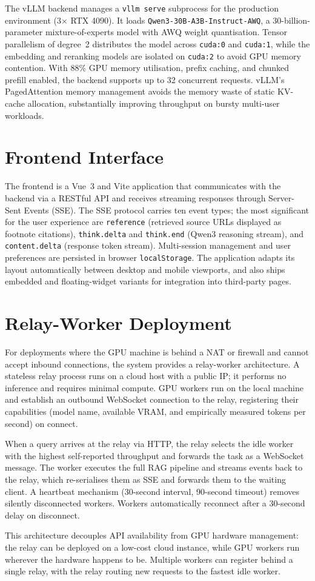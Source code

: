 The vLLM backend \parencite{vllm2023} manages a \texttt{vllm serve} subprocess for the production environment (3$\times$ RTX 4090). It loads \texttt{Qwen3-30B-A3B-Instruct-AWQ}, a 30-billion-parameter mixture-of-experts model with AWQ weight quantisation. Tensor parallelism of degree~2 distributes the model across \texttt{cuda:0} and \texttt{cuda:1}, while the embedding and reranking models are isolated on \texttt{cuda:2} to avoid GPU memory contention. With 88\% GPU memory utilisation, prefix caching, and chunked prefill enabled, the backend supports up to 32 concurrent requests. vLLM's PagedAttention memory management avoids the memory waste of static KV-cache allocation, substantially improving throughput on bursty multi-user workloads.

\section{Frontend Interface}

The frontend is a Vue~3 and Vite application that communicates with the backend via a RESTful API and receives streaming responses through Server-Sent Events (SSE). The SSE protocol carries ten event types; the most significant for the user experience are \texttt{reference} (retrieved source URLs displayed as footnote citations), \texttt{think.delta} and \texttt{think.end} (Qwen3 reasoning stream), and \texttt{content.delta} (response token stream). Multi-session management and user preferences are persisted in browser \texttt{localStorage}. The application adapts its layout automatically between desktop and mobile viewports, and also ships embedded and floating-widget variants for integration into third-party pages.

\section{Relay-Worker Deployment}

For deployments where the GPU machine is behind a NAT or firewall and cannot accept inbound connections, the system provides a relay-worker architecture. A stateless relay process runs on a cloud host with a public IP; it performs no inference and requires minimal compute. GPU workers run on the local machine and establish an outbound WebSocket connection to the relay, registering their capabilities (model name, available VRAM, and empirically measured tokens per second) on connect.

When a query arrives at the relay via HTTP, the relay selects the idle worker with the highest self-reported throughput and forwards the task as a WebSocket message. The worker executes the full RAG pipeline and streams events back to the relay, which re-serialises them as SSE and forwards them to the waiting client. A heartbeat mechanism (30-second interval, 90-second timeout) removes silently disconnected workers. Workers automatically reconnect after a 30-second delay on disconnect.

This architecture decouples API availability from GPU hardware management: the relay can be deployed on a low-cost cloud instance, while GPU workers run wherever the hardware happens to be. Multiple workers can register behind a single relay, with the relay routing new requests to the fastest idle worker.
